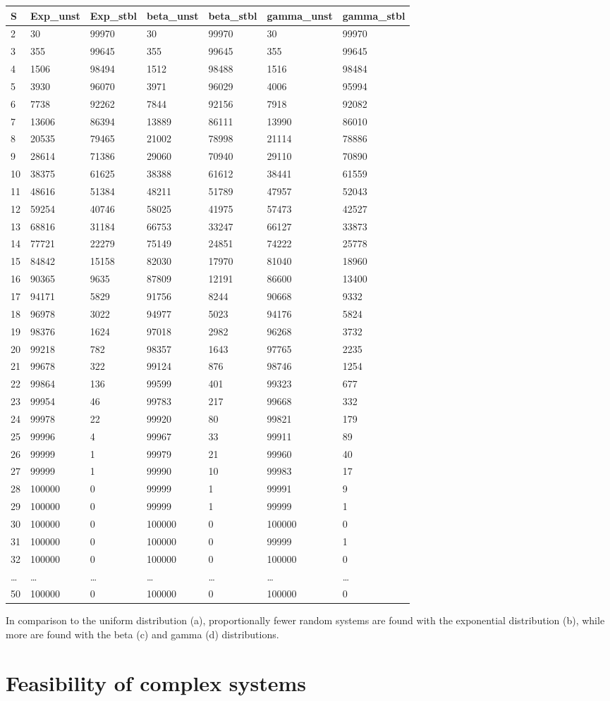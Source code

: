 \documentclass[]{article}
\begin{document}
\begin{longtable}[]{@{}lllllll@{}}
\toprule
S & Exp\_unst & Exp\_stbl & beta\_unst & beta\_stbl & gamma\_unst &
gamma\_stbl\tabularnewline
\midrule
\endhead
2 & 30 & 99970 & 30 & 99970 & 30 & 99970\tabularnewline
3 & 355 & 99645 & 355 & 99645 & 355 & 99645\tabularnewline
4 & 1506 & 98494 & 1512 & 98488 & 1516 & 98484\tabularnewline
5 & 3930 & 96070 & 3971 & 96029 & 4006 & 95994\tabularnewline
6 & 7738 & 92262 & 7844 & 92156 & 7918 & 92082\tabularnewline
7 & 13606 & 86394 & 13889 & 86111 & 13990 & 86010\tabularnewline
8 & 20535 & 79465 & 21002 & 78998 & 21114 & 78886\tabularnewline
9 & 28614 & 71386 & 29060 & 70940 & 29110 & 70890\tabularnewline
10 & 38375 & 61625 & 38388 & 61612 & 38441 & 61559\tabularnewline
11 & 48616 & 51384 & 48211 & 51789 & 47957 & 52043\tabularnewline
12 & 59254 & 40746 & 58025 & 41975 & 57473 & 42527\tabularnewline
13 & 68816 & 31184 & 66753 & 33247 & 66127 & 33873\tabularnewline
14 & 77721 & 22279 & 75149 & 24851 & 74222 & 25778\tabularnewline
15 & 84842 & 15158 & 82030 & 17970 & 81040 & 18960\tabularnewline
16 & 90365 & 9635 & 87809 & 12191 & 86600 & 13400\tabularnewline
17 & 94171 & 5829 & 91756 & 8244 & 90668 & 9332\tabularnewline
18 & 96978 & 3022 & 94977 & 5023 & 94176 & 5824\tabularnewline
19 & 98376 & 1624 & 97018 & 2982 & 96268 & 3732\tabularnewline
20 & 99218 & 782 & 98357 & 1643 & 97765 & 2235\tabularnewline
21 & 99678 & 322 & 99124 & 876 & 98746 & 1254\tabularnewline
22 & 99864 & 136 & 99599 & 401 & 99323 & 677\tabularnewline
23 & 99954 & 46 & 99783 & 217 & 99668 & 332\tabularnewline
24 & 99978 & 22 & 99920 & 80 & 99821 & 179\tabularnewline
25 & 99996 & 4 & 99967 & 33 & 99911 & 89\tabularnewline
26 & 99999 & 1 & 99979 & 21 & 99960 & 40\tabularnewline
27 & 99999 & 1 & 99990 & 10 & 99983 & 17\tabularnewline
28 & 100000 & 0 & 99999 & 1 & 99991 & 9\tabularnewline
29 & 100000 & 0 & 99999 & 1 & 99999 & 1\tabularnewline
30 & 100000 & 0 & 100000 & 0 & 100000 & 0\tabularnewline
31 & 100000 & 0 & 100000 & 0 & 99999 & 1\tabularnewline
32 & 100000 & 0 & 100000 & 0 & 100000 & 0\tabularnewline
\ldots{} & \ldots{} & \ldots{} & \ldots{} & \ldots{} & \ldots{} &
\ldots{}\tabularnewline
50 & 100000 & 0 & 100000 & 0 & 100000 & 0\tabularnewline
\bottomrule
\end{longtable}

In comparison to the uniform distribution (a), proportionally fewer
random systems are found with the exponential distribution (b), while
more are found with the beta (c) and gamma (d) distributions.

\hypertarget{Feasibility}{%
\section{Feasibility of complex systems}\label{Feasibility}}
\end{document}
